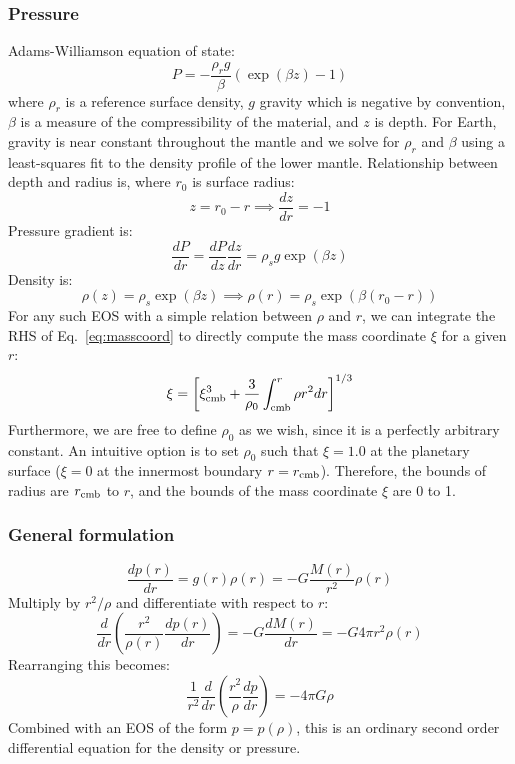\subsubsection{Pressure}
Adams-Williamson equation of state:
\begin{equation}
P = - \frac{\rho_r g}{\beta} (\exp( \beta z )-1)
\end{equation}
where $\rho_r$ is a reference surface density, $g$ gravity which is negative by convention, $\beta$ is a measure of the compressibility of the material, and $z$ is depth.  For Earth, gravity is near constant throughout the mantle and we solve for $\rho_r$ and $\beta$ using a least-squares fit to the density profile of the lower mantle.  Relationship between depth and radius is, where $r_0$ is surface radius:
\begin{equation}
z = r_0 - r \implies \frac{dz}{dr} = -1
\end{equation}
Pressure gradient is:
\begin{equation}
\frac{dP}{dr} = \frac{dP}{dz} \frac{dz}{dr} = \rho_s g \exp( \beta z )
\end{equation}
Density is:
\begin{equation}
\rho(z) = \rho_s \exp( \beta z ) \implies \rho(r) = \rho_s \exp( \beta (r_0 - r) )
\end{equation}
For any such EOS with a simple relation between $\rho$ and $r$, we can integrate the RHS of Eq.~\ref{eq:masscoord} to directly compute the mass coordinate $\xi$ for a given $r$:
\begin{equation}
\xi = \left[ \xi_{\rm cmb}^3 + \frac{3}{\rho_0} \int_{\rm cmb}^r \rho r^2 dr \right] ^ {1/3}
\end{equation}
Furthermore, we are free to define $\rho_0$ as we wish, since it is a perfectly arbitrary constant.  An intuitive option is to set $\rho_0$ such that $\xi=1.0$ at the planetary surface ($\xi=0$ at the innermost boundary $r=r_{\rm cmb}$).  Therefore, the bounds of radius are $r_{\rm cmb}$ to $r$, and the bounds of the mass coordinate $\xi$ are 0 to 1.
 
\subsubsection{General formulation}
\begin{equation}
\frac{dp(r)}{dr} = g(r) \rho(r) = -G \frac{M(r)}{r^2}\rho(r)
\end{equation}
Multiply by $r^2/\rho$ and differentiate with respect to $r$:
\begin{equation}
\frac{d}{dr} \left( \frac{r^2}{\rho(r)} \frac{dp(r)}{dr} \right) = -G \frac{dM(r)}{dr} = -G 4 \pi r^2 \rho(r)
\end{equation}
Rearranging this becomes:
\begin{equation}
\frac{1}{r^2} \frac{d}{dr} \left( \frac{r^2}{\rho}\frac{dp}{dr} \right) = -4 \pi G \rho
\end{equation}
Combined with an EOS of the form $p=p(\rho)$, this is an ordinary second order differential equation for the density or pressure.
 
